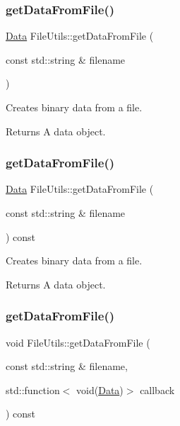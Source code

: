 \subsubsection{\texorpdfstring{get\+Data\+From\+File()}{getDataFromFile()}\hspace{0.1cm}{\footnotesize\ttfamily [1/3]}}
{\footnotesize\ttfamily \hyperlink{classData}{Data} File\+Utils\+::get\+Data\+From\+File (\begin{DoxyParamCaption}\item[{const std\+::string \&}]{filename }\end{DoxyParamCaption})\hspace{0.3cm}{\ttfamily [virtual]}}

Creates binary data from a file. \begin{DoxyReturn}{Returns}
A data object. 
\end{DoxyReturn}
\mbox{\label{classFileUtils_ac59d79a67f7ce17ce47db607bba31ed7}} 
\subsubsection{\texorpdfstring{get\+Data\+From\+File()}{getDataFromFile()}\hspace{0.1cm}{\footnotesize\ttfamily [2/3]}}
{\footnotesize\ttfamily \hyperlink{classData}{Data} File\+Utils\+::get\+Data\+From\+File (\begin{DoxyParamCaption}\item[{const std\+::string \&}]{filename }\end{DoxyParamCaption}) const\hspace{0.3cm}{\ttfamily [virtual]}}

Creates binary data from a file. \begin{DoxyReturn}{Returns}
A data object. 
\end{DoxyReturn}
\mbox{\label{classFileUtils_a1a2683fad8f40963f4ffa382ad47fca4}} 
\subsubsection{\texorpdfstring{get\+Data\+From\+File()}{getDataFromFile()}\hspace{0.1cm}{\footnotesize\ttfamily [3/3]}}
{\footnotesize\ttfamily void File\+Utils\+::get\+Data\+From\+File (\begin{DoxyParamCaption}\item[{const std\+::string \&}]{filename,  }\item[{std\+::function$<$ void(\hyperlink{classData}{Data})$>$}]{callback }\end{DoxyParamCaption}) const\hspace{0.3cm}{\ttfamily [virtual]}}

